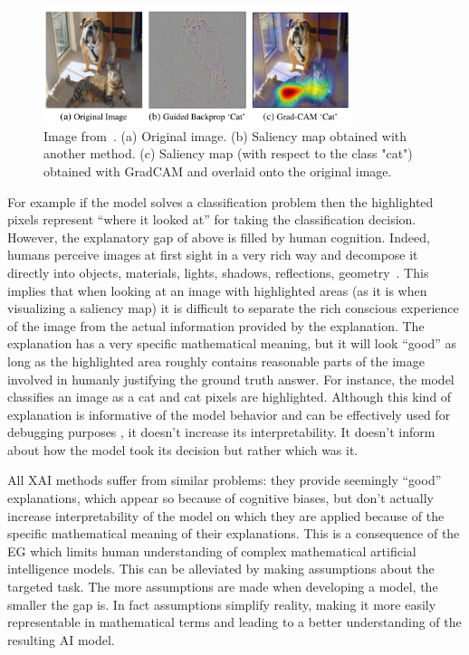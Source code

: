 \begin{figure}
    \centering
    \includegraphics[width=0.8\textwidth]{figs/grad_cam}
    \caption{
        Image from~\cite{GradCAM}.
        (a) Original image.
        (b) Saliency map obtained with another method.
        (c) Saliency map (with respect to the class "cat") obtained with GradCAM and overlaid onto the original image.
        \label{fig:grad_cam}
    }
\end{figure}

For example if the model solves a classification problem then the highlighted pixels represent “where it looked at” for taking the classification decision.
However, the explanatory gap of above is filled by human cognition.
Indeed, humans perceive images at first sight in a very rich way and decompose it directly into objects, materials, lights, shadows, reflections, geometry~\cite{pinker2009mind}.
This implies that when looking at an image with highlighted areas (as it is when visualizing a saliency map) it is difficult to separate the rich conscious experience of the image from the actual information provided by the explanation.
The explanation has a very specific mathematical meaning, but it will look “good” as long as the highlighted area roughly contains reasonable parts of the image involved in humanly justifying the ground truth answer.
For instance, the model classifies an image as a cat and cat pixels are highlighted.
Although this kind of explanation is informative of the model behavior and can be effectively used for debugging purposes \cite{molnar2022}, it doesn't increase its interpretability.
It doesn't inform about how the model took its decision but rather which was it. 

All XAI methods suffer from similar problems: they provide seemingly “good” explanations, which appear so because of cognitive biases, but don't actually increase interpretability of the model on which they are applied because of the specific mathematical meaning of their explanations.
This is a consequence of the EG which limits human understanding of complex mathematical artificial intelligence models.
This can be alleviated by making assumptions about the targeted task.
The more assumptions are made when developing a model, the smaller the gap is.
In fact assumptions simplify reality, making it more easily representable in mathematical terms and leading to a better understanding of the resulting AI model.

